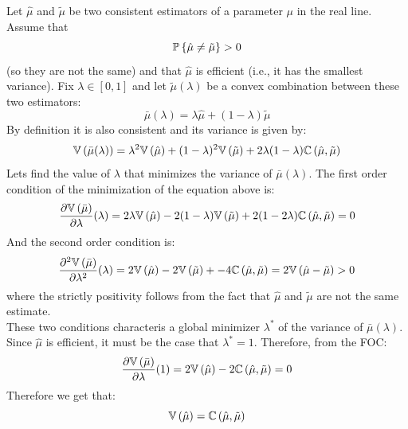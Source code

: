 \documentclass[12pt,twoside]{article}
\begin{document}
\begin{solution}
    Let \(\hat\mu\) and \(\tilde\mu\) be two consistent estimators of a parameter \(\mu\) in the real line. Assume that 
    \[
        \mathbb{P}\left\lbrace \hat\mu \neq \tilde\mu \right\rbrace > 0
    \]
    (so they are not the same) and that \(\hat\mu\) is efficient (i.e., it has the smallest variance). Fix \(\lambda \in [0,1]\) and let \(\tilde\mu(\lambda)\) be a convex combination between these two estimators:
    \[
        \bar\mu(\lambda) = \lambda \hat\mu + (1-\lambda) \tilde\mu
    \]
    By definition it is also consistent and its variance is given by:
    \[
        \mathbb{V}\left(\bar\mu(\lambda)\right) = \lambda^2 \mathbb{V}\left(\hat\mu\right) + (1-\lambda)^2 \mathbb{V}\left(\tilde\mu\right) + 2\lambda(1-\lambda)\mathbb{C}\left( \hat\mu, \tilde\mu \right)
    \]  
    Lets find the value of \(\lambda\) that minimizes the variance of \(\bar\mu(\lambda)\). The first order condition of the minimization of the equation above is:
    \[
        \frac{\partial \mathbb{V}\left(\bar\mu\right)}{\partial \lambda}(\lambda) = 2\lambda \mathbb{V}\left(\hat\mu\right) - 2(1-\lambda) \mathbb{V}\left(\tilde\mu\right) + 2(1-2\lambda)\mathbb{C}\left( \hat\mu,  \tilde\mu \right) = 0
    \]
    And the second order condition is:
    \[
        \frac{\partial^2 \mathbb{V}\left(\bar\mu\right)}{\partial \lambda^2}(\lambda) = 2 \mathbb{V}\left(\hat\mu\right) - 2 \mathbb{V}\left(\tilde\mu\right) + - 4\mathbb{C}\left( \hat\mu, \tilde\mu \right) = 2\mathbb{V}\left(\hat\mu-\tilde\mu\right)> 0
    \]
    where the strictly positivity follows from the fact that \(\hat\mu\) and \(\tilde\mu\) are not the same estimate. \\
    These two conditions characteris a global minimizer \(\lambda^\ast\) of the variance of \(\bar\mu(\lambda)\). Since \(\hat\mu\) is efficient, it must be the case that \(\lambda^\ast = 1\). Therefore, from the FOC:
    \[
        \frac{\partial \mathbb{V}\left(\bar\mu\right)}{\partial \lambda}(1) = 2\mathbb{V}\left(\hat\mu\right) - 2\mathbb{C}\left( \hat\mu,  \tilde\mu \right) = 0
    \]
    Therefore we get that:
    \[
        \mathbb{V}\left(\hat\mu\right) = \mathbb{C}\left( \hat\mu, \tilde\mu \right)
    \]
\end{solution}

\newpage 
\end{document}
